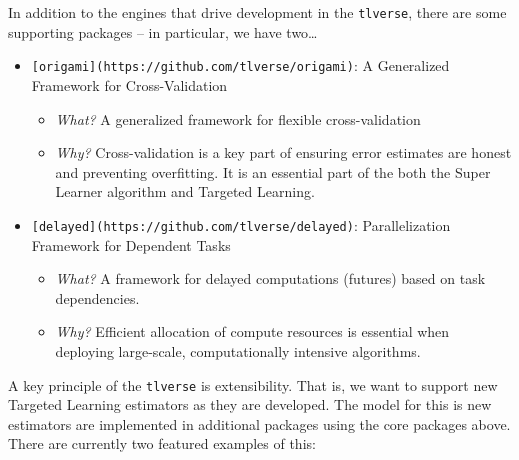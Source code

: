 \documentclass[
  12pt, krantz2,
]{krantz}
\newcommand{\passthrough}[1]{#1}
\providecommand{\tightlist}{%
  \setlength{\itemsep}{0pt}\setlength{\parskip}{0pt}}
\theoremstyle{definition}
\theoremstyle{definition}
\theoremstyle{definition}
\newcommand{\1}{\mathbbm{1}}
\begin{document}
In addition to the engines that drive development in the \passthrough{\lstinline!tlverse!}, there are some supporting packages -- in particular, we have two\ldots{}

\begin{itemize}
\tightlist
\item
  \passthrough{\lstinline![origami](https://github.com/tlverse/origami)!}: A Generalized Framework for Cross-Validation

  \begin{itemize}
  \tightlist
  \item
    \emph{What?} A generalized framework for flexible cross-validation
  \item
    \emph{Why?} Cross-validation is a key part of ensuring error estimates are honest and preventing overfitting. It is an essential part of the both the Super Learner algorithm and Targeted Learning.
  \end{itemize}
\item
  \passthrough{\lstinline![delayed](https://github.com/tlverse/delayed)!}: Parallelization Framework for Dependent Tasks

  \begin{itemize}
  \tightlist
  \item
    \emph{What?} A framework for delayed computations (futures) based on task dependencies.
  \item
    \emph{Why?} Efficient allocation of compute resources is essential when deploying large-scale, computationally intensive algorithms.
  \end{itemize}
\end{itemize}

A key principle of the \passthrough{\lstinline!tlverse!} is extensibility. That is, we want to support new Targeted Learning estimators as they are developed. The model for this is new estimators are implemented in additional packages using the core packages above. There are currently two featured examples of this:
\end{document}
